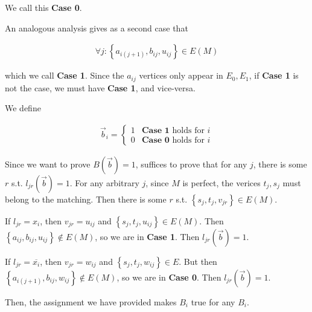 \documentclass[a4paper]{article}
\begin{document}
We call this \textbf{Case 0}.

An analogous analysis gives as a second case that 

\begin{align*}
    \forall j : \left\{ a_{i(j+1)}, b_{ij}, u_{ij} \right\} \in E(M) 
\end{align*}

which we call \textbf{Case 1}. Since the $a_{ij}$ vertices only appear in $E_0,
E_1$, if \textbf{Case 1} is not the case, we must have \textbf{Case 1}, and
vice-versa.

We define 

\begin{align*}
    \overrightarrow{b}_i = \begin{cases}
        1 & \textbf{Case 1} \text{ holds for } i\\
        0 & \textbf{Case 0} \text{ holds for } i
    \end{cases}
\end{align*}

Since we want to prove $B(\overrightarrow{b}) = 1$, suffices to prove that for
any $j$, there is some $r$ s.t. $l_{jr}(\overrightarrow{b}) = 1$. For any arbitrary 
$j$, since $M$ is perfect, the verices $t_j, s_j$ must belong to the matching.
Then there is some $r$ s.t. $\left\{ s_j, t_j, v_{jr} \right\} \in E(M)$.

If $l_{jr} = x_i$, then $v_{jr} = u_{ij}$ and $\left\{ s_j, t_j, u_{ij} \right\} \in E(M)$.
Then $\left\{ a_{ij}, b_{ij}, u_{ij} \right\} \not\in E(M)$, so we 
are in \textbf{Case 1}. Then $l_{jr}(\overrightarrow{b}) = 1$.

If $l_{jr} = \overline{x_i}$, then $v_{jr} = w_{ij}$ and $\left\{ s_j, t_j, w_{ij} \right\} \in E$.
But then $\left\{ a_{i(j+1)}, b_{ij}, w_{ij} \right\} \not\in E(M) $,
so we are in \textbf{Case 0}. Then $l_{jr}(\overrightarrow{b}) = 1$.

Then, the assignment we have provided makes $B_i$ true for any 
$B_i$.
\end{document}
